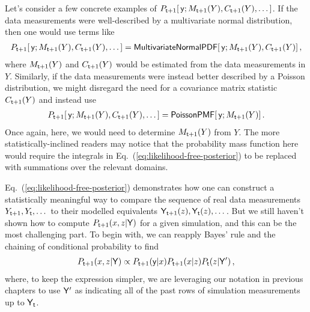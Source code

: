 Let's consider a few concrete examples of $P_{{\sf t}+1}[\,{\sf y};M_{{\sf t}+1}(Y),C_{{\sf t}+1}(Y), \dots ]$. If the data measurements were well-described by a multivariate normal distribution, then one would use terms like
\begin{align}
P_{{\sf t}+1}[\,{\sf y};M_{{\sf t}+1}(Y),C_{{\sf t}+1}(Y), \dots ] = {\sf MultivariateNormalPDF}[\,{\sf y};M_{{\sf t}+1}(Y),C_{{\sf t}+1}(Y)]\,,
\end{align}
where $M_{{\sf t}+1}(Y)$ and $C_{{\sf t}+1}(Y)$ would be estimated from the data measurements in $Y$. Similarly, if the data measurements were instead better described by a Poisson distribution, we might disregard the need for a covariance matrix statistic $C_{{\sf t}+1}(Y)$ and instead use
\begin{align}
P_{{\sf t}+1}[\,{\sf y};M_{{\sf t}+1}(Y),C_{{\sf t}+1}(Y), \dots ] = {\sf PoissonPMF}[\,{\sf y};M_{{\sf t}+1}(Y)]\,.
\end{align}
Once again, here, we would need to determine $M_{{\sf t}+1}(Y)$ from $Y$. The more statistically-inclined readers may notice that the probability mass function here would require the integrals in Eq.~(\ref{eq:likelihood-free-posterior}) to be replaced with summations over the relevant domains.

Eq.~(\ref{eq:likelihood-free-posterior}) demonstrates how one can construct a statistically meaningful way to compare the sequence of real data measurements $Y_{{\sf t}+1}, Y_{{\sf t}}, \dots$ to their modelled equivalents ${\sf Y}_{{\sf t}+1}(z), {\sf Y}_{{\sf t}}(z), \dots$. But we still haven't shown how to compute $P_{{\sf t}+1}(x,z\vert {\sf Y})$ for a given simulation, and this can be the most challenging part. To begin with, we can reapply Bayes' rule and the chaining of conditional probability to find 
\begin{align}
P_{{\sf t}+1}(x,z\vert {\sf Y}) \propto P_{{\sf t}+1}({\sf y}\vert x)P_{{\sf t}+1}(x\vert z)P_{{\sf t}}(z\vert {\sf Y}') \,,
\end{align}
where, to keep the expression simpler, we are leveraging our notation in previous chapters to use ${\sf Y}'$ as indicating all of the past rows of simulation measurements up to ${\sf Y}_{{\sf t}}$. 

